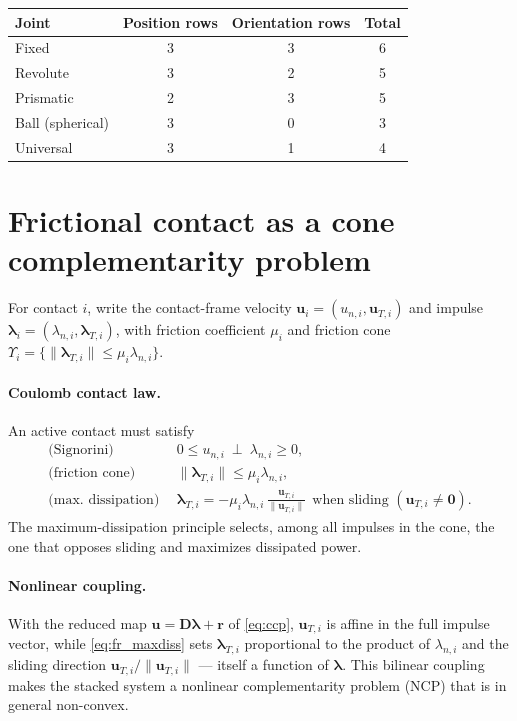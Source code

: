 \documentclass{article}
\newcommand{\Del}{\mathbf{D}}         %
\newcommand{\blam}{\boldsymbol{\lambda}}
\newcommand{\rhs}{\mathbf{r}}
\newcommand{\cone}{\Upsilon}
\newcommand{\uvel}{\mathbf{u}}           %
\theoremstyle{plain}
\theoremstyle{definition}
\begin{document}
\begin{center}
\begin{tabular}{@{}lccc@{}}
\toprule
Joint & Position rows & Orientation rows & Total \\
\midrule
Fixed & 3 & 3 & 6 \\
Revolute & 3 & 2 & 5 \\
Prismatic & 2 & 3 & 5 \\
Ball (spherical) & 3 & 0 & 3 \\
Universal & 3 & 1 & 4 \\
\bottomrule
\end{tabular}
\end{center}

\section{Frictional contact as a cone complementarity problem}
\label{app:friction_ccp}
For contact $i$, write the contact-frame velocity $\uvel_i=(u_{n,i},\mathbf u_{T,i})$ and
impulse $\blam_i=(\lambda_{n,i},\boldsymbol\lambda_{T,i})$, with friction
coefficient $\mu_i$ and friction cone
$\cone_i=\{\|\boldsymbol\lambda_{T,i}\|\le\mu_i\lambda_{n,i}\}$.

\paragraph{Coulomb contact law.} An active contact must satisfy
\begin{align}
\text{(Signorini)}\ &\ 0\le u_{n,i}\ \perp\ \lambda_{n,i}\ge0, \label{eq:fr_sig}\\
\text{(friction cone)}\ &\ \|\boldsymbol\lambda_{T,i}\|\le\mu_i\lambda_{n,i},
  \label{eq:fr_cone}\\
\text{(max.\ dissipation)}\ &\ \boldsymbol\lambda_{T,i}
  =-\mu_i\lambda_{n,i}\,\frac{\mathbf u_{T,i}}{\|\mathbf u_{T,i}\|}
  \ \ \text{when sliding }(\mathbf u_{T,i}\neq\mathbf 0). \label{eq:fr_maxdiss}
\end{align}
The maximum-dissipation principle selects, among all impulses in the cone, the one
that opposes sliding and maximizes dissipated power.

\paragraph{Nonlinear coupling.} With the reduced map $\uvel=\Del\blam+\rhs$ of
\eqref{eq:ccp}, $\mathbf u_{T,i}$ is affine in the full impulse vector, while
\eqref{eq:fr_maxdiss} sets $\boldsymbol\lambda_{T,i}$ proportional to the product
of $\lambda_{n,i}$ and the sliding direction $\mathbf u_{T,i}/\|\mathbf u_{T,i}\|$
--- itself a function of $\blam$. This bilinear coupling makes the stacked system a
nonlinear complementarity problem (NCP) that is in general non-convex.
\end{document}
